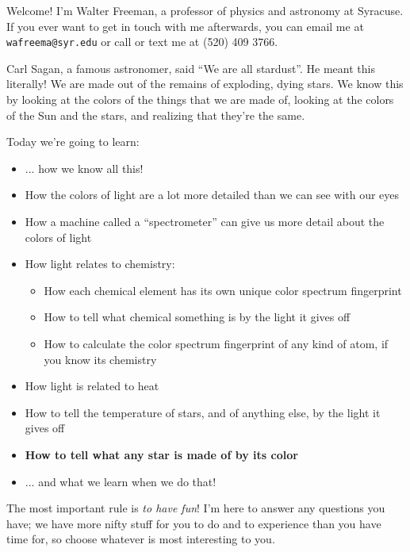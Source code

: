 \documentclass[12pt]{article}
\begin{document}

\begin{center}\end{center}

Welcome! I'm Walter Freeman, a professor of physics and astronomy at Syracuse. If you ever want to get in touch with me
afterwards, you can email me at {\tt wafreema@syr.edu} or call or text me at (520) 409 3766.

Carl Sagan, a famous astronomer, said ``We are all stardust''. He meant this literally! We are made out of the remains of
exploding, dying stars. We know this by looking at the 
colors of the things that we are made of, looking at the colors of the Sun and the stars, and realizing that they're the same.

Today we're going to learn:

\begin{itemize}
\item ... how we know all this!
\item How the colors of light are a lot more detailed than we can see with our eyes
\item How a machine called a ``spectrometer'' can give us more detail about the colors of light
\item How light relates to chemistry:
\begin{itemize}
\item How each chemical element has its own unique color spectrum fingerprint
\item How to tell what chemical something is by the light it gives off
\item How to calculate the color spectrum fingerprint of any kind of atom, if you know its chemistry
\end{itemize}
\item How light is related to heat
\item How to tell the temperature of stars, and of anything else, by the light it gives off
\item {\bf How to tell what any star is made of by its color}
\item ... and what we learn when we do that!
\end{itemize}

The most important rule is {\it to have fun}! I'm here to answer any questions you have; we have more nifty stuff
for you to do and to experience than you have time for, so choose whatever is most interesting to you. 
\end{document}
